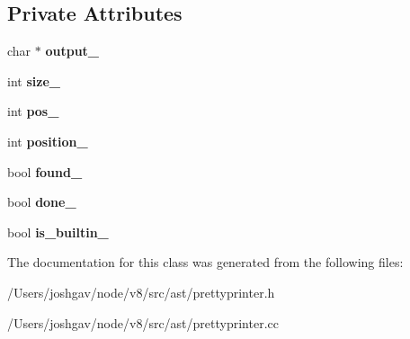 \subsection*{Private Attributes}
\begin{DoxyCompactItemize}
\item 
char $\ast$ {\bfseries output\+\_\+}\hypertarget{classv8_1_1internal_1_1_call_printer_a57b3cf38e087d67e594582ed5cfd347f}{}\label{classv8_1_1internal_1_1_call_printer_a57b3cf38e087d67e594582ed5cfd347f}

\item 
int {\bfseries size\+\_\+}\hypertarget{classv8_1_1internal_1_1_call_printer_ac41ddd5d7097ee80cb44d737d77cfc14}{}\label{classv8_1_1internal_1_1_call_printer_ac41ddd5d7097ee80cb44d737d77cfc14}

\item 
int {\bfseries pos\+\_\+}\hypertarget{classv8_1_1internal_1_1_call_printer_a7ae6f8bf2d4848cc02736a09cee35586}{}\label{classv8_1_1internal_1_1_call_printer_a7ae6f8bf2d4848cc02736a09cee35586}

\item 
int {\bfseries position\+\_\+}\hypertarget{classv8_1_1internal_1_1_call_printer_a5570904da49d28a7496eb27a09facd58}{}\label{classv8_1_1internal_1_1_call_printer_a5570904da49d28a7496eb27a09facd58}

\item 
bool {\bfseries found\+\_\+}\hypertarget{classv8_1_1internal_1_1_call_printer_ac7f9b82d96b9cac2291a2daaa0e07685}{}\label{classv8_1_1internal_1_1_call_printer_ac7f9b82d96b9cac2291a2daaa0e07685}

\item 
bool {\bfseries done\+\_\+}\hypertarget{classv8_1_1internal_1_1_call_printer_a24cedc1541f49fd010810a8e67a5e310}{}\label{classv8_1_1internal_1_1_call_printer_a24cedc1541f49fd010810a8e67a5e310}

\item 
bool {\bfseries is\+\_\+builtin\+\_\+}\hypertarget{classv8_1_1internal_1_1_call_printer_a7c7ce4cfbc2c37a4faed4a2d9487e539}{}\label{classv8_1_1internal_1_1_call_printer_a7c7ce4cfbc2c37a4faed4a2d9487e539}

\end{DoxyCompactItemize}


The documentation for this class was generated from the following files\+:\begin{DoxyCompactItemize}
\item 
/\+Users/joshgav/node/v8/src/ast/prettyprinter.\+h\item 
/\+Users/joshgav/node/v8/src/ast/prettyprinter.\+cc\end{DoxyCompactItemize}
